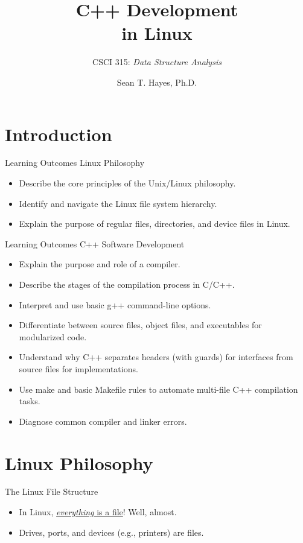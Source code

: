 \documentclass[14pt,aspectratio=1610]{beamer}
\title{\Huge{}{\ttfamily\bfseries C++} Development\\in Linux}
\subtitle{CSCI 315: \textit{Data Structure Analysis}}
\author{Sean T. Hayes, Ph.D.}
\institute{Charleston Southern University}
\begin{document}
\begin{frame}
  \titlepage
\end{frame}

\section{Introduction}

\begin{frame}{Learning Outcomes}
  Linux Philosophy
  \begin{itemize}
    \item Describe the core principles of the Unix/Linux philosophy.
    \item Identify and navigate the Linux file system hierarchy.
    \item Explain the purpose of regular files, directories, and device files in Linux.
  \end{itemize}
\end{frame}

\begin{frame}{Learning Outcomes}
  C++ Software Development
  \begin{itemize}
      \item Explain the purpose and role of a compiler.
      \item Describe the stages of the compilation process in C/C++.
      \item Interpret and use basic g++ command-line options.
      \item Differentiate between source files, object files, and executables for modularized code.
      \item Understand why C++ separates headers (with guards) for interfaces from source files for implementations.
      \item Use make and basic Makefile rules to automate multi-file C++ compilation tasks.
      \item Diagnose common compiler and linker errors.
  \end{itemize}
\end{frame}

\section{Linux Philosophy}

\begin{frame}{The Linux File Structure}
\begin{itemize}
  \item<+-> In Linux, \href{https://en.wikipedia.org/wiki/Everything_is_a_file}{\emph{everything} is a file}! Well, almost.
  \item<+-> Drives, ports, and devices (e.g., printers) are files.
\end{itemize}
\end{frame}
\end{document}
